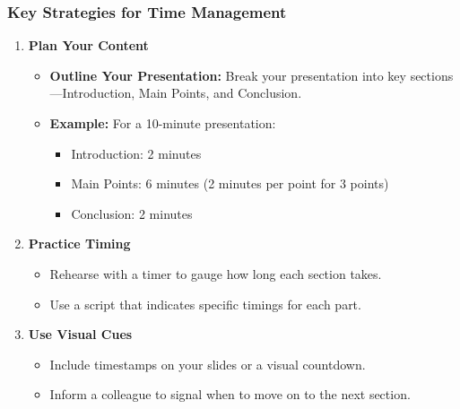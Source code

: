 \documentclass[aspectratio=169]{beamer}
\begin{document}
\begin{frame}[fragile]
    \frametitle{Key Strategies for Time Management}
    \begin{enumerate}
        \item \textbf{Plan Your Content}
            \begin{itemize}
                \item \textbf{Outline Your Presentation:} Break your presentation into key sections—Introduction, Main Points, and Conclusion.
                \item \textbf{Example:} For a 10-minute presentation:
                    \begin{itemize}
                        \item Introduction: 2 minutes
                        \item Main Points: 6 minutes (2 minutes per point for 3 points)
                        \item Conclusion: 2 minutes
                    \end{itemize}
            \end{itemize}
        
        \item \textbf{Practice Timing}
            \begin{itemize}
                \item Rehearse with a timer to gauge how long each section takes.
                \item Use a script that indicates specific timings for each part.
            \end{itemize}
        
        \item \textbf{Use Visual Cues}
            \begin{itemize}
                \item Include timestamps on your slides or a visual countdown.
                \item Inform a colleague to signal when to move on to the next section.
            \end{itemize}
    \end{enumerate}
\end{frame}
\end{document}
